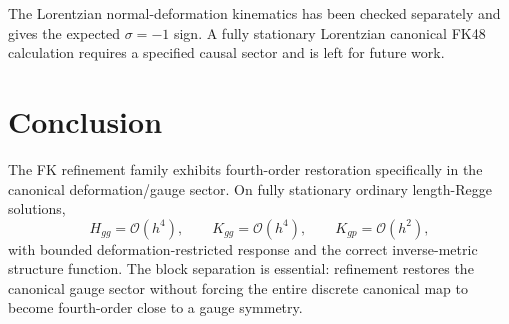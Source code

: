 \documentclass[11pt]{article}
\newcommand{\Oh}{\mathcal{O}}
\newcommand{\Kgg}{K_{gg}}
\newcommand{\Kgp}{K_{gp}}
\begin{document}
The Lorentzian normal-deformation kinematics has been checked separately and gives the expected $\sigma=-1$ sign. A fully stationary Lorentzian canonical FK48 calculation requires a specified causal sector and is left for future work.

\section{Conclusion}
The FK refinement family exhibits fourth-order restoration specifically in the canonical deformation/gauge sector. On fully stationary ordinary length-Regge solutions,
\[
H_{gg}=\Oh(h^4),\qquad \Kgg=\Oh(h^4),\qquad \Kgp=\Oh(h^2),
\]
with bounded deformation-restricted response and the correct inverse-metric structure function. The block separation is essential: refinement restores the canonical gauge sector without forcing the entire discrete canonical map to become fourth-order close to a gauge symmetry.

\printbibliography
\end{document}
